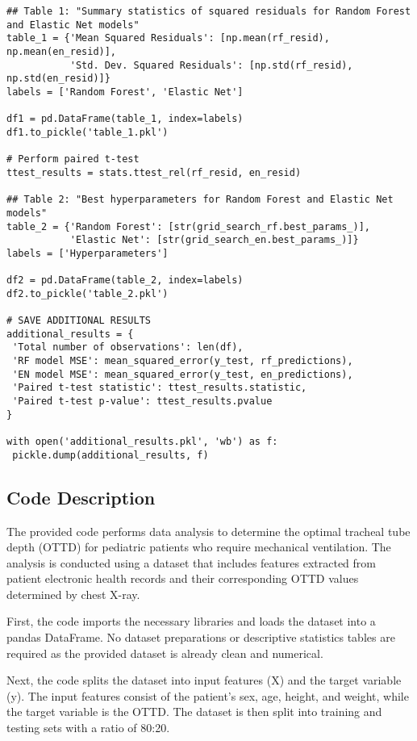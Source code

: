\documentclass[11pt]{article}
\begin{document}
\begin{verbatim}
## Table 1: "Summary statistics of squared residuals for Random Forest and Elastic Net models"
table_1 = {'Mean Squared Residuals': [np.mean(rf_resid), np.mean(en_resid)],
           'Std. Dev. Squared Residuals': [np.std(rf_resid), np.std(en_resid)]}
labels = ['Random Forest', 'Elastic Net']

df1 = pd.DataFrame(table_1, index=labels)
df1.to_pickle('table_1.pkl')

# Perform paired t-test
ttest_results = stats.ttest_rel(rf_resid, en_resid)

## Table 2: "Best hyperparameters for Random Forest and Elastic Net models"
table_2 = {'Random Forest': [str(grid_search_rf.best_params_)],
           'Elastic Net': [str(grid_search_en.best_params_)]}
labels = ['Hyperparameters']

df2 = pd.DataFrame(table_2, index=labels)
df2.to_pickle('table_2.pkl')

# SAVE ADDITIONAL RESULTS
additional_results = {
 'Total number of observations': len(df), 
 'RF model MSE': mean_squared_error(y_test, rf_predictions),
 'EN model MSE': mean_squared_error(y_test, en_predictions),
 'Paired t-test statistic': ttest_results.statistic,
 'Paired t-test p-value': ttest_results.pvalue
}

with open('additional_results.pkl', 'wb') as f:
 pickle.dump(additional_results, f)

\end{verbatim}

\subsection{Code Description}

The provided code performs data analysis to determine the optimal tracheal tube depth (OTTD) for pediatric patients who require mechanical ventilation. The analysis is conducted using a dataset that includes features extracted from patient electronic health records and their corresponding OTTD values determined by chest X-ray.

First, the code imports the necessary libraries and loads the dataset into a pandas DataFrame. No dataset preparations or descriptive statistics tables are required as the provided dataset is already clean and numerical.

Next, the code splits the dataset into input features (X) and the target variable (y). The input features consist of the patient's sex, age, height, and weight, while the target variable is the OTTD. The dataset is then split into training and testing sets with a ratio of 80:20.
\end{document}
